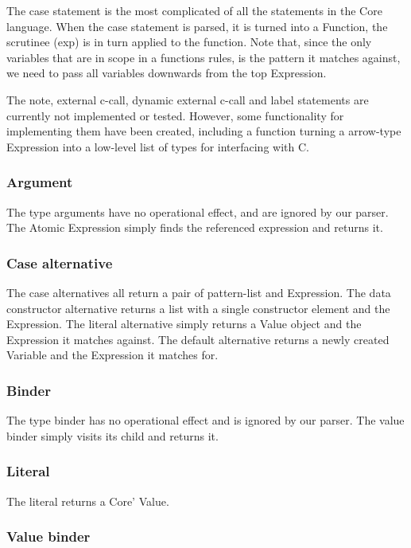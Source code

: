 The case statement is the most complicated of all the statements in the Core language.
When the case statement is parsed, it is turned into a Function, the scrutinee (exp) 
is in turn applied to the function. Note that, since the only variables that are in
scope in a functions rules, is the pattern it matches against, we need to pass all 
variables downwards from the top Expression.

The note, external c-call, dynamic external c-call and label statements are currently
not implemented or tested. However, some functionality for implementing them have been
created, including a function turning a arrow-type Expression into a low-level list
of types for interfacing with C.

\subsubsection*{Argument}

The type arguments have no operational effect, and are ignored by our parser.
The Atomic Expression simply finds the referenced expression and returns it.

\subsubsection*{Case alternative}

The case alternatives all return a pair of pattern-list and Expression. The
data constructor alternative returns a list with a single constructor element and
the Expression. The literal alternative simply returns a Value object and the 
Expression it matches against. The default alternative returns a newly created
Variable and the Expression it matches for.

\subsubsection*{Binder}

The type binder has no operational effect and is ignored by our parser. The 
value binder simply visits its child and returns it.

\subsubsection*{Literal}

The literal returns a Core' Value.


\subsubsection*{Value binder}

